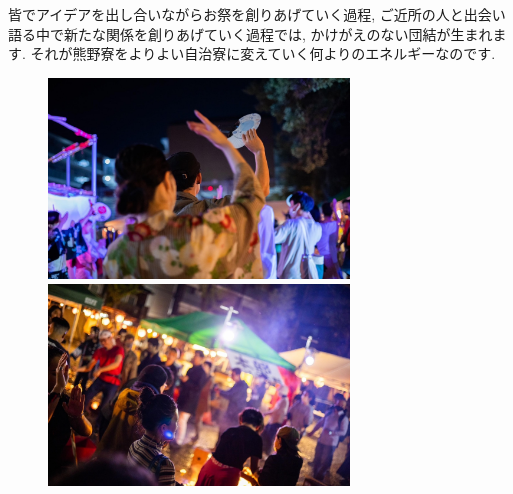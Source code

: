 皆でアイデアを出し合いながらお祭を創りあげていく過程, ご近所の人と出会い語る中で新たな関係を創りあげていく過程では, かけがえのない団結が生まれます. それが熊野寮をよりよい自治寮に変えていく何よりのエネルギーなのです.




\begin{figure}[H]
  \begin{minipage}[H]{.5\textwidth}
    \centering
    \includegraphics[width=8cm]{gazo/kumanomaturi2.pdf}
  \end{minipage}
  \begin{minipage}[H]{.5\textwidth}
    \centering
    \includegraphics[width=8cm]{gazo/kumanomaturi3.pdf}
  \end{minipage}
\end{figure}

